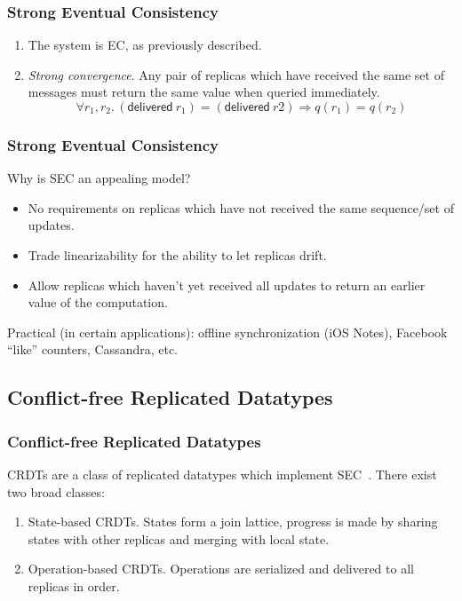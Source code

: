 \documentclass[aspectratio=169,compress,handout]{beamer}
\newcommand*{\CRDTs}{\textsf{CRDTs}\xspace}
\newcommand*{\EC}{\textsf{EC}\xspace}
\newcommand*{\SEC}{\textsf{SEC}\xspace}
\begin{document}
  \begin{frame}
    \frametitle{Strong Eventual Consistency}

    \begin{definition}
      \begin{enumerate}[<+->]
        \item The system is \EC, as previously described.
        \item \emph{Strong convergence}. Any pair of replicas which have
          received the same set of messages must return the same value when
          queried immediately.
          \[
            \forall r_1, r_2.\, (\textsf{delivered}~r_1) =
              (\textsf{delivered}~r2) \Rightarrow q(r_1) = q(r_2)
          \]
      \end{enumerate}
    \end{definition}
  \end{frame}

  \begin{frame}
    \frametitle{Strong Eventual Consistency}

    Why is \SEC an appealing model?
    \begin{itemize}[<+->]
      \item No requirements on replicas which have not received the same
        sequence/set of updates.
      \item Trade linearizability for the ability to let replicas drift.
      \item Allow replicas which haven't yet received all updates to return an
        earlier value of the computation.
    \end{itemize}

    \pause
    Practical (in certain applications): offline synchronization (iOS Notes),
    Facebook ``like'' counters, Cassandra, etc.
  \end{frame}

  \subsection{Conflict-free Replicated Datatypes}
  \begin{frame}
    \frametitle{Conflict-free Replicated Datatypes}

    \CRDTs are a class of replicated datatypes which implement
    \SEC~\cite{shapiro11}. There exist two broad classes:
    \begin{enumerate}[<+->]
      \item State-based \CRDTs. States form a join lattice, progress is made by
        sharing states with other replicas and merging with local state.
      \item Operation-based \CRDTs. Operations are serialized and delivered to
        all replicas in order.
    \end{enumerate}
  \end{frame}
\end{document}
